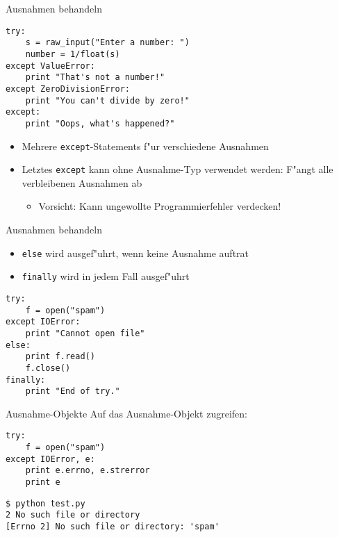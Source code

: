 \begin{frame}[fragile]{Ausnahmen behandeln}
\begin{lstlisting}[style=Python]
try:
    s = raw_input("Enter a number: ")
    number = 1/float(s)
except ValueError:
    print "That's not a number!"
except ZeroDivisionError:
    print "You can't divide by zero!"
except:
    print "Oops, what's happened?"
\end{lstlisting}
\begin{itemize}
\item Mehrere \lstinline{except}-Statements f"ur verschiedene Ausnahmen
\item Letztes \lstinline{except} kann ohne Ausnahme-Typ verwendet werden: F"angt alle verbleibenen Ausnahmen ab
\begin{itemize}
\item Vorsicht: Kann ungewollte Programmierfehler verdecken!
\end{itemize}
\end{itemize}
\end{frame}

\begin{frame}[fragile]{Ausnahmen behandeln}
\begin{itemize}
\item \alert{\texttt{else}} wird ausgef"uhrt, wenn keine Ausnahme auftrat
\item \alert{\texttt{finally}} wird in \alert{jedem} Fall ausgef"uhrt
\end{itemize}
\begin{lstlisting}[style=Python]
try:
    f = open("spam")
except IOError:
    print "Cannot open file"
else:
    print f.read()
    f.close()
finally:
    print "End of try."
\end{lstlisting}
\end{frame}

\begin{frame}[fragile]{Ausnahme-Objekte}
Auf das Ausnahme-Objekt zugreifen:
\begin{lstlisting}[style=Python]
try:
    f = open("spam")
except IOError, e:
    print e.errno, e.strerror
    print e
\end{lstlisting}
\begin{lstlisting}[style=Shell]
$ python test.py
2 No such file or directory
[Errno 2] No such file or directory: 'spam'
\end{lstlisting}%
\end{frame}

